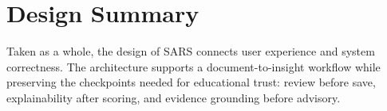 \section{Design Summary}
Taken as a whole, the design of SARS connects user experience and system correctness. The architecture supports a document-to-insight workflow while preserving the checkpoints needed for educational trust: review before save, explainability after scoring, and evidence grounding before advisory.

